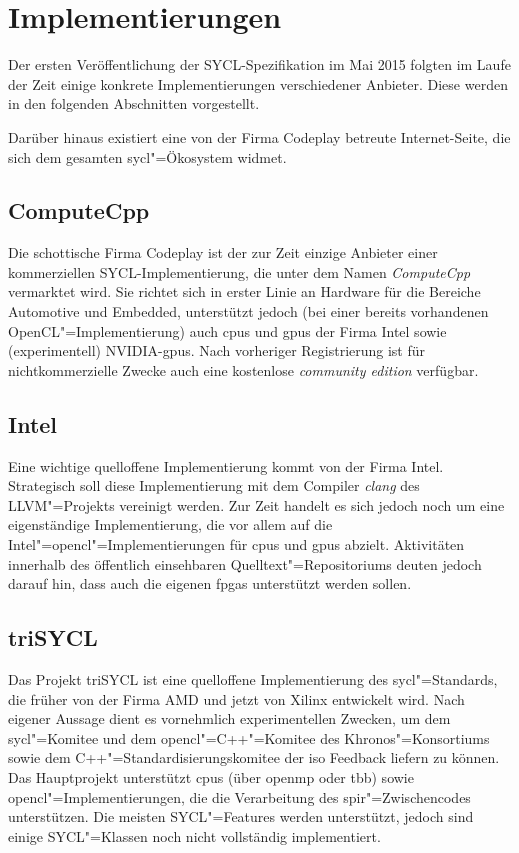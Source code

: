 \section{Implementierungen}\label{sycl:implementierungen}

Der ersten Veröffentlichung der SYCL-Spezifikation im Mai 2015 folgten im Laufe
der Zeit einige konkrete Implementierungen verschiedener Anbieter. Diese werden
in den folgenden Abschnitten vorgestellt.

Darüber hinaus existiert eine von der Firma Codeplay betreute Internet-Seite,
die sich dem gesamten \gls{sycl}"=Ökosystem widmet. \cite[vgl.][]{sycltech}

\subsection{ComputeCpp}

Die schottische Firma Codeplay ist der zur Zeit einzige Anbieter einer
kommerziellen SYCL-Implementierung, die unter dem Namen \textit{ComputeCpp}
vermarktet wird. Sie richtet sich in erster Linie an Hardware für die Bereiche
Automotive und Embedded, unterstützt jedoch (bei einer bereits vorhandenen
OpenCL"=Implementierung) auch \gls{cpu}s und \gls{gpu}s der Firma Intel sowie
(experimentell) NVIDIA-\gls{gpu}s. Nach vorheriger Registrierung ist für
nichtkommerzielle Zwecke auch eine kostenlose \textit{community edition}
verfügbar. \cite[vgl.][]{computecpp}

\subsection{Intel}

Eine wichtige quelloffene Implementierung kommt von der Firma Intel. Strategisch
soll diese Implementierung mit dem Compiler \textit{clang} des LLVM"=Projekts
vereinigt werden. Zur Zeit handelt es sich jedoch noch um eine eigenständige
Implementierung, die vor allem auf die Intel"=\gls{opencl}"=Implementierungen
für \gls{cpu}s und \gls{gpu}s abzielt. Aktivitäten innerhalb des öffentlich
einsehbaren Quelltext"=Repositoriums deuten jedoch darauf hin, dass auch die
eigenen \gls{fpga}s unterstützt werden sollen. \cite[vgl.][]{intelsycl}

\subsection{triSYCL}

Das Projekt triSYCL ist eine quelloffene Implementierung des
\gls{sycl}"=Standards, die früher von der Firma AMD und jetzt von Xilinx
entwickelt wird. Nach eigener Aussage dient es vornehmlich experimentellen
Zwecken, um dem \gls{sycl}"=Komitee und dem \gls{opencl}"=C++"=Komitee des
Khronos"=Konsortiums sowie dem C++"=Standardisierungskomitee der \gls{iso}
Feedback liefern zu können. Das Hauptprojekt unterstützt \gls{cpu}s (über \gls{openmp}
oder \gls{tbb}) sowie \gls{opencl}"=Implementierungen, die die Verarbeitung des
\gls{spir}"=Zwischencodes unterstützen. Die meisten SYCL"=Features werden
unterstützt, jedoch sind einige SYCL"=Klassen noch nicht vollständig
implementiert.\cite[vgl.][]{trisycl}

